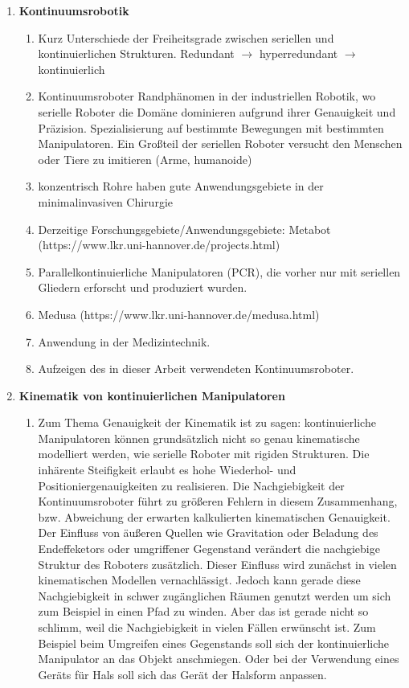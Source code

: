 \begin{enumerate}
\item \textbf{Kontinuumsrobotik}
\begin{enumerate}

\item Kurz Unterschiede der Freiheitsgrade zwischen seriellen und kontinuierlichen Strukturen. Redundant $\rightarrow$ hyperredundant $\rightarrow$ kontinuierlich

\item Kontinuumsroboter Randphänomen in der industriellen Robotik, wo serielle Roboter die Domäne dominieren aufgrund ihrer Genauigkeit und Präzision. Spezialisierung auf bestimmte Bewegungen mit bestimmten Manipulatoren. Ein Großteil der seriellen Roboter versucht den Menschen oder Tiere zu imitieren (Arme, humanoide)

\item konzentrisch Rohre haben gute Anwendungsgebiete in der minimalinvasiven Chirurgie

\item Derzeitige Forschungsgebiete/Anwendungsgebiete: Metabot (https://www.lkr.uni-hannover.de/projects.html)

\item Parallelkontinuierliche Manipulatoren (PCR), die vorher nur mit seriellen Gliedern erforscht und produziert wurden.

\item Medusa (https://www.lkr.uni-hannover.de/medusa.html)

\item Anwendung in der Medizintechnik.

\item Aufzeigen des in dieser Arbeit verwendeten Kontinuumsroboter.

\end{enumerate}
\item \textbf{Kinematik von kontinuierlichen Manipulatoren}
\begin{enumerate}

\item Zum Thema Genauigkeit der Kinematik ist zu sagen: kontinuierliche Manipulatoren können grundsätzlich nicht so genau kinematische modelliert werden, wie serielle Roboter mit rigiden Strukturen. Die inhärente Steifigkeit erlaubt es hohe Wiederhol- und Positioniergenauigkeiten zu realisieren. Die Nachgiebigkeit der Kontinuumsroboter führt zu größeren Fehlern in diesem Zusammenhang, bzw. Abweichung der erwarten kalkulierten kinematischen Genauigkeit. Der Einfluss von äußeren Quellen wie Gravitation oder Beladung des Endeffeketors oder umgriffener Gegenstand verändert die nachgiebige Struktur des Roboters zusätzlich. Dieser Einfluss wird zunächst in vielen kinematischen Modellen vernachlässigt. Jedoch kann gerade diese Nachgiebigkeit in schwer zugänglichen Räumen genutzt werden um sich zum Beispiel in einen Pfad zu winden. Aber das ist gerade nicht so schlimm, weil die Nachgiebigkeit in vielen Fällen erwünscht ist. Zum Beispiel beim Umgreifen eines Gegenstands soll sich der kontinuierliche Manipulator an das Objekt anschmiegen. Oder bei der Verwendung eines Geräts für Hals soll sich das Gerät der Halsform anpassen. 


\end{enumerate}
\end{enumerate}
